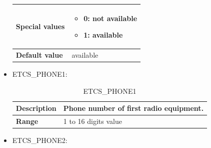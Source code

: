 \begin{itemize}
\begin{longtable}{|l|l|}
				\hline

					\begin{minipage}[t]{0.22\linewidth} \textbf{Special values}	\end{minipage}
				&	\begin{minipage}[t]{0.78\linewidth} \begin{itemize} \item 0: not available \item 1: available \end{itemize} \end{minipage} \\

				\hline

					\begin{minipage}[t]{0.22\linewidth} \textbf{Default value}	\end{minipage}
				&	\begin{minipage}[t]{0.78\linewidth} available \end{minipage} \\

				\hline

			\end{longtable}

		\item ETCS\_PHONE1:

			\begin{longtable}{|l|l|}
				\caption{ETCS\_PHONE1}\\
				\hline

					\begin{minipage}[t]{0.22\linewidth} \textbf{Description}	\end{minipage}
				&	\begin{minipage}[t]{0.78\linewidth} Phone number of first radio equipment. \end{minipage} \\

				\hline

					\begin{minipage}[t]{0.22\linewidth} \textbf{Range}	\end{minipage}
				&	\begin{minipage}[t]{0.78\linewidth} 1 to 16 digits value \end{minipage} \\

				\hline

			\end{longtable}

		\item ETCS\_PHONE2:


\end{itemize}
